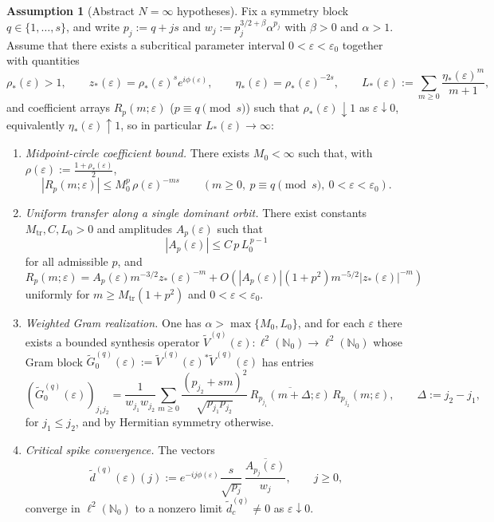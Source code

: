 \documentclass[11pt]{amsart}
\numberwithin{equation}{section}
\theoremstyle{plain}
\theoremstyle{definition}
\newtheorem{assumption}[theorem]{Assumption}
\theoremstyle{remark}
\begin{document}
\begin{assumption}[Abstract \(N=\infty\) hypotheses]\label{ass:infty-rank-one}
Fix a symmetry block \(q\in\{1,\dots,s\}\), and write \(p_j:=q+js\) and
\(w_j:=p_j^{3/2+\beta}\alpha^{p_j}\) with \(\beta>0\) and \(\alpha>1\).
Assume that there exists a subcritical parameter interval
\(0<\varepsilon<\varepsilon_0\) together with quantities
\[
\rho_*(\varepsilon)>1,\qquad
z_*(\varepsilon)=\rho_*(\varepsilon)^s e^{i\phi(\varepsilon)},\qquad
\eta_*(\varepsilon)=\rho_*(\varepsilon)^{-2s},\qquad
L_*(\varepsilon):=\sum_{m\ge0}\frac{\eta_*(\varepsilon)^m}{m+1},
\]
and coefficient arrays \(R_p(m;\varepsilon)\) (\(p\equiv q \!\!\!\pmod s\))
such that \(\rho_*(\varepsilon)\downarrow1\) as \(\varepsilon\downarrow0\), equivalently
\(\eta_*(\varepsilon)\uparrow1\), so in particular \(L_*(\varepsilon)\to\infty\):


\begin{enumerate}[label=\textup{(A\arabic*)},leftmargin=2.8em]
\item\label{it:infty-A1}
\emph{Midpoint-circle coefficient bound.} There exists
\(M_0<\infty\) such that, with
\(\rho(\varepsilon):=\frac{1+\rho_*(\varepsilon)}{2}\),
\[
|R_p(m;\varepsilon)|\le M_0^p\,\rho(\varepsilon)^{-ms}
\qquad (m\ge0,\ p\equiv q \!\!\!\pmod s,\ 0<\varepsilon<\varepsilon_0).
\]

\item\label{it:infty-A2}
\emph{Uniform transfer along a single dominant orbit.} There exist
constants \(M_{\mathrm{tr}},C,L_0>0\) and amplitudes \(A_p(\varepsilon)\) such
that
\[
|A_p(\varepsilon)|\le C\,p\,L_0^{\,p-1}
\]
for all admissible \(p\), and
\[
R_p(m;\varepsilon)
=
A_p(\varepsilon)m^{-3/2}z_*(\varepsilon)^{-m}
+
O\left(
|A_p(\varepsilon)|(1+p^2)m^{-5/2}|z_*(\varepsilon)|^{-m}
\right)
\]
uniformly for \(m\ge M_{\mathrm{tr}}(1+p^2)\) and
\(0<\varepsilon<\varepsilon_0\).

\item\label{it:infty-A3}
\emph{Weighted Gram realization.} One has \(\alpha>\max\{M_0,L_0\}\), and for each
\(\varepsilon\) there exists a bounded synthesis operator
\(\widetilde V^{(q)}(\varepsilon):\ell^2(\mathbb N_0)\to \ell^2(\mathbb N_0)\)
whose Gram block
\(\widetilde G^{(q)}_0(\varepsilon):=\widetilde V^{(q)}(\varepsilon)^*
\widetilde V^{(q)}(\varepsilon)\) has entries
\[
(\widetilde G^{(q)}_0(\varepsilon))_{j_1j_2}
=
\frac{1}{w_{j_1}w_{j_2}}
\sum_{m\ge0}
\frac{(p_{j_2}+sm)^2}{\sqrt{p_{j_1}p_{j_2}}}\,
\overline{R_{p_{j_1}}(m+\Delta;\varepsilon)}\,
R_{p_{j_2}}(m;\varepsilon),
\qquad
\Delta:=j_2-j_1,
\]
for \(j_1\le j_2\), and by Hermitian symmetry otherwise.

\item\label{it:infty-A4}
\emph{Critical spike convergence.} The vectors
\[
\widetilde d^{(q)}(\varepsilon)(j)
:=
e^{-ij\phi(\varepsilon)}
\frac{s}{\sqrt{p_j}}\,
\frac{\overline{A_{p_j}(\varepsilon)}}{w_j},
\qquad j\ge0,
\]
converge in \(\ell^2(\mathbb N_0)\) to a nonzero limit
\(\widetilde d^{(q)}_c\neq0\) as \(\varepsilon\downarrow0\).
\end{enumerate}
\end{assumption}
\end{document}
